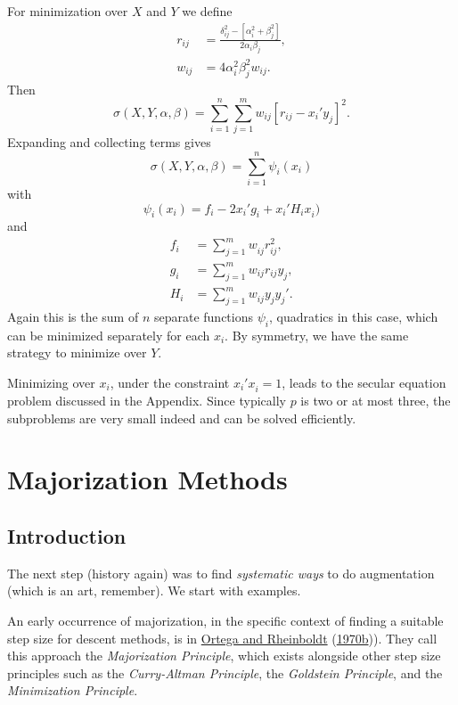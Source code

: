 \documentclass[
  12pt,
]{book}
\begin{document}
For minimization over \(X\) and \(Y\) we define
\begin{align*}
r_{ij}&=\frac{\delta_{ij}^{2}-[\alpha_{i}^{2}+\beta_{j}^{2}]}{2\alpha_{i}\beta_{j}},\\
w_{ij}&=4\alpha_{i}^{2}\beta_{j}^{2}w_{ij}.
\end{align*}
Then
\[
\sigma(X,Y,\alpha,\beta)=\sum_{i=1}^{n}\sum_{j=1}^{m}w_{ij}[r_{ij}-x_{i}'y_{j}^{}]^{2}.
\]
Expanding and collecting terms gives
\[
\sigma(X,Y,\alpha,\beta)=\sum_{i=1}^{n}\psi_{i}(x_{i})
\]
with
\[
\psi_{i}(x_{i})=f_{i}^{}-2x_{i}'g_{i}^{}+x_{i}'H_{i}^{}x_{i}^{})
\]
and
\begin{align*}
f_{i}&=\sum_{j=1}^{m}w_{ij}^{}r_{ij}^{2},\\
g_{i}&=\sum_{j=1}^{m}w_{ij}r_{ij}y_{j},\\
H_{i}&=\sum_{j=1}^{m}w_{ij}^{}y_{j}^{}y_{j}'.
\end{align*}
Again this is the sum of \(n\) separate functions \(\psi_{i}\), quadratics in this case, which can
be minimized separately for each \(x_{i}\). By symmetry, we have the same strategy
to minimize over \(Y\).

Minimizing over \(x_{i}\), under the constraint \(x_{i}'x_{i}^{}=1\), leads to the secular
equation problem discussed in the Appendix. Since
typically \(p\) is two or at most three, the subproblems are very small indeed and can be
solved efficiently.

\hypertarget{majorization-methods}{%
\chapter{Majorization Methods}\label{majorization-methods}}

\hypertarget{introduction-2}{%
\section{Introduction}\label{introduction-2}}

The next step (history again) was to find \emph{systematic ways} to do
augmentation (which is an art, remember). We start with examples.

An early occurrence of majorization, in the specific context of finding a suitable step size for descent methods,
is in \protect\hyperlink{ref-ortega_rheinboldt_70a}{Ortega and Rheinboldt} (\protect\hyperlink{ref-ortega_rheinboldt_70a}{1970b})). They call this
approach the \emph{Majorization Principle}, which exists alongside other step size principles such as the \emph{Curry-Altman Principle},
the \emph{Goldstein Principle}, and the \emph{Minimization Principle}.
\end{document}
